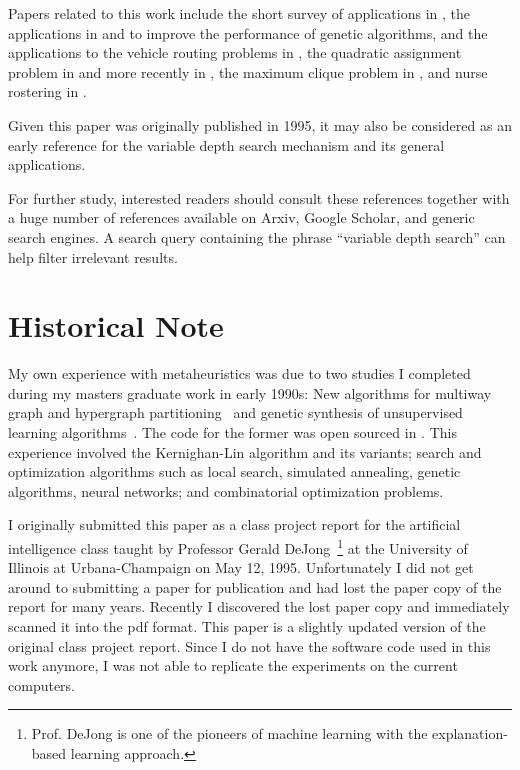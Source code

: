 \documentclass{article}
\begin{document}
Papers related to this work include the short survey of applications
in \cite{AhErOr02}, the applications in \cite{Gr03} and \cite{MeFr02}
to improve the performance of genetic algorithms, and the applications
to the vehicle routing problems in \cite{VaLeSc90,VaLeSc93}, the
quadratic assignment problem in \cite{Sk90} and more recently in
\cite{GoGo12,MeFr02,Pa09}, the maximum clique problem in
\cite{KaSaNa07}, and nurse rostering in \cite{BuCuQu07}.

Given this paper was originally published in 1995, it may also be
considered as an early reference for the variable depth search
mechanism and its general applications.

For further study, interested readers should consult these references
together with a huge number of references available on Arxiv, Google
Scholar, and generic search engines. A search query containing the
phrase ``variable depth search'' can help filter irrelevant results.

\section{Historical Note}
\label{sec:historical}

My own experience with metaheuristics was due to two studies I
completed during my masters graduate work in early 1990s: New
algorithms for multiway graph and hypergraph
partitioning~\cite{DaAy97} and genetic synthesis of unsupervised
learning algorithms~\cite{DaOf93a,DaOf93b}. The code for the former
was open sourced in \cite{Da18a,Da18b}. This experience involved the
Kernighan-Lin algorithm and its variants; search and optimization
algorithms such as local search, simulated annealing, genetic
algorithms, neural networks; and combinatorial optimization
problems. 

I originally submitted this paper as a class project report for the
artificial intelligence class taught by Professor Gerald
DeJong~\footnote{Prof. DeJong is one of the pioneers of machine
learning with the explanation-based learning approach.} at the
University of Illinois at Urbana-Champaign on May 12,
1995. Unfortunately I did not get around to submitting a paper for
publication and had lost the paper copy of the report for many
years. Recently I discovered the lost paper copy and immediately
scanned it into the pdf format. This paper is a slightly updated
version of the original class project report. Since I do not have the
software code used in this work anymore, I was not able to replicate
the experiments on the current computers.
\end{document}
